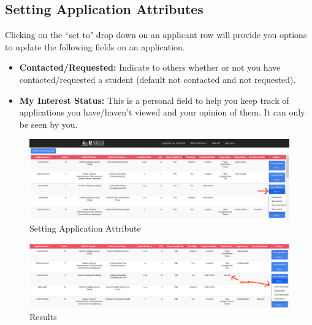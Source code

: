 \documentclass[fontsize=12pt,paper=letter,twoside]{scrartcl}
\begin{document}
\subsection{Setting Application Attributes}
Clicking on the ``set to" drop down on an applicant row will provide you options to update the following fields on an application.
\begin{itemize}
\item \textbf{Contacted/Requested:} Indicate to others whether or not you have contacted/requested a student (default not contacted and not requested).
\item \textbf{My Interest Status:} This is a personal field to help you keep track of applications you have/haven't viewed and your opinion of them. It can only be seen by you.
\end{itemize}

\begin{figure}[!htb]
\begin{center}
\includegraphics[width=.99\textwidth]{images/set_attribute.png}
\end{center}
\caption{Setting Application Attribute}
\label{fig:set_attribute}
\end{figure}

\begin{figure}[!htb]
\begin{center}
\includegraphics[width=.99\textwidth]{images/set_attribute2.png}
\end{center}
\caption{Results}
\label{fig:set_attribute_results}
\end{figure}
\end{document}

